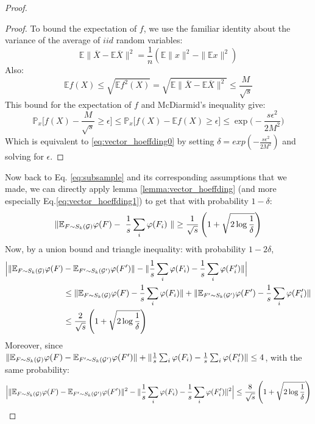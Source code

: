 \begin{proof}
\begin{proof}
To bound the expectation of $f$, we use the familiar identity about the variance of the average of $iid$ random variables:
\begin{equation}
\mathbb{E}\|\overline{X}-\mathbb{E}\overline{X}\|^2=\frac{1}{n}(\mathbb{E}\|x\|^2-\|\mathbb{E}x\|^2 ) 
\end{equation}
Also:
\[ \mathbb{E}f(X)\leq\sqrt{\mathbb{E}f^2(X)}=\sqrt{\mathbb{E}\|\overline{X}-\mathbb{E}\overline{X}\|^2}\leq \frac{M}{\sqrt{{s}}}\]
This bound for the expectation of $f$ and McDiarmid's inequality give: 
\begin{equation}
\label{eq:vector_hoeffding1}
    \mathbb{P}_x \Big [ f(X)-\frac{M}{\sqrt{{s}}}\geq \epsilon \Big ]\leq
    \mathbb{P}_x \Big [ f(X)-\mathbb{E}f(X)\geq \epsilon \Big ]\leq
    \exp\Big( -\frac{{s}\epsilon^2}{2M^2}\Big)
\end{equation}
Which is equivalent to \eqref{eq:vector_hoeffding0} by setting $\delta=exp( -\frac{{s}\epsilon^2}{2M^2})$ and solving for $\epsilon$.
\end{proof}
Now back to Eq. \eqref{eq:subsample} and its corresponding assumptions that we made, we can directly apply lemma \ref{lemma:vector_hoeffding} (and more especially Eq.\eqref{eq:vector_hoeffding1}) to get that with probability $1-\delta$:
\begin{equation}
    \label{eq:fixed_w}
    \|\mathbb{E}_{F \sim S_k(\mathcal{G})} \varphi(F)-~\frac{1}{s} \sum_i \varphi(F_i)~\|\geq \frac{1}{\sqrt{{s}}}\left(1+\sqrt{2\log\frac{1}{\delta}}\right)
\end{equation}
Now, by a union bound and triangle inequality: with probability $1-2\delta$,
\begin{align*}
    \Big | \| \mathbb{E}_{F \sim S_k(\mathcal{G})} \varphi(F)& - \mathbb{E}_{F' \sim S_k(\mathcal{G}')} \varphi(F')\| - \| \frac{1}{{s}} \sum_i \varphi(F_i) - \frac{1}{{s}} \sum_i \varphi(F'_i)\|\Big | \\
    &\leq  \| \mathbb{E}_{F \sim S_k(\mathcal{G})} \varphi(F) -  \frac{1}{{s}} \sum_i \varphi(F_i) \| + \|\mathbb{E}_{F' \sim S_k(\mathcal{G}')} \varphi(F') - \frac{1}{{s}} \sum_i \varphi(F'_i)\| \\
    &\leq \frac{2}{\sqrt{{s}}}\left(1+\sqrt{2\log\frac{1}{\delta}}\right)
\end{align*}
Moreover, since $\| \mathbb{E}_{F \sim S_k(\mathcal{G})} \varphi(F)- \mathbb{E}_{F' \sim S_k(\mathcal{G}')} \varphi(F')\| + \| \frac{1}{{s}} \sum_i \varphi(F_i) - \frac{1}{{s}} \sum_i \varphi(F'_i)\| \leq 4$, with the same probability:
\begin{equation}\label{eq:step2}
    \Big | \| \mathbb{E}_{F \sim S_k(\G)} \varphi(F) - \mathbb{E}_{F' \sim S_k(\G')} \varphi(F')\|^2 - \| \frac{1}{{s}} \sum_i \varphi(F_i) - \frac{1}{{s}} \sum_i \varphi(F'_i)\|^2\Big | \leq \frac{8}{\sqrt{{s}}}\left(1+\sqrt{2\log\frac{1}{\delta}}\right)

\end{equation}
\end{proof}
